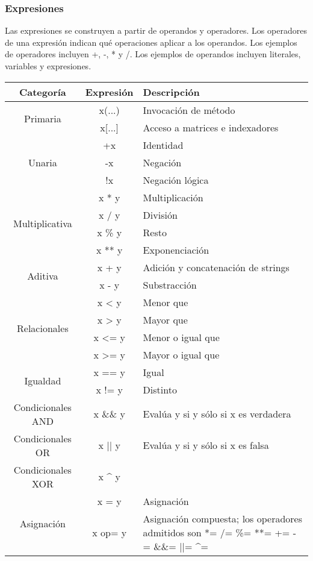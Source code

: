 	\subsubsection{Expresiones}
		Las expresiones se construyen a partir de operandos y operadores. Los operadores de una expresión indican qué operaciones aplicar a los operandos. Los ejemplos de operadores incluyen +, -, * y /. Los ejemplos de operandos incluyen literales, variables y expresiones.\par
		\begin{center}
			\begin{tabular}{| c | c | m{5cm} | }
				\hline
				Categoría & Expresión & Descripción \\ \hline
				\multirow{2}{*}{Primaria} & x(...) & Invocación de método \\ \cline{2-3}
				& x[...] & Acceso a matrices e indexadores \\ \hline
				\multirow{3}{*}{Unaria} & +x & Identidad \\ \cline{2-3}
				& -x & Negación \\ \cline{2-3}
				& !x & Negación lógica \\ \hline
				\multirow{4}{*}{Multiplicativa} & x * y & Multiplicación \\ \cline{2-3}
				& x / y & División \\ \cline{2-3}
				& x \% y & Resto \\ \cline{2-3} 
				& x ** y & Exponenciación \\ \hline
				\multirow{2}{*}{Aditiva} & x + y & Adición y concatenación de strings \\ \cline{2-3}
				& x - y & Substracción \\ \hline
				\multirow{4}{*}{Relacionales} & x < y & Menor que \\ \cline{2-3} 
				& x > y & Mayor que \\ \cline{2-3}
				& x <= y & Menor o igual que \\ \cline{2-3} 
				& x >= y & Mayor o igual que \\ \hline
			    \multirow{2}{*}{Igualdad} & x == y & Igual \\ \cline{2-3} 
			    & x != y & Distinto \\ \hline 
			    Condicionales AND & x \&\& y & Evalúa y si y sólo si x es verdadera \\ \hline
			    Condicionales OR & x || y & Evalúa y si y sólo si x es falsa \\ \hline
			    Condicionales XOR & x \textasciicircum{} y & \\ \hline
			    \multirow{2}{*}{Asignación} & x = y & Asignación \\ \cline{2-3}
			    & x op= y & Asignación compuesta; los operadores admitidos son *= /= \%= **= += -= \&\&= ||= \textasciicircum{}= \\ \hline
			\end{tabular}
		\end{center}
